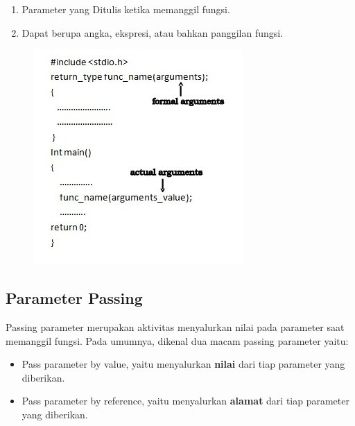 \begin{enumerate}
\begin{enumerate}
    \item Parameter yang Ditulis ketika memanggil fungsi.
	\item Dapat berupa angka, ekspresi, atau bahkan panggilan fungsi.
\end{enumerate}
\begin{figure}[H]
	\centering
	\includegraphics[width=0.5\linewidth]{../P3/img/screenshot006.png}
	\caption{}
	\label{fig:parameterformalaktual}
\end{figure}
\end{enumerate}
\subsection{Parameter Passing} 
Passing parameter merupakan aktivitas menyalurkan nilai pada parameter saat memanggil fungsi. Pada umumnya, dikenal dua macam passing parameter yaitu:
\begin{itemize}
    \item Pass parameter by value, yaitu menyalurkan \textbf{nilai} dari tiap parameter yang diberikan.
    \item Pass parameter by reference, yaitu menyalurkan \textbf{alamat} dari tiap parameter yang diberikan.
\end{itemize}

